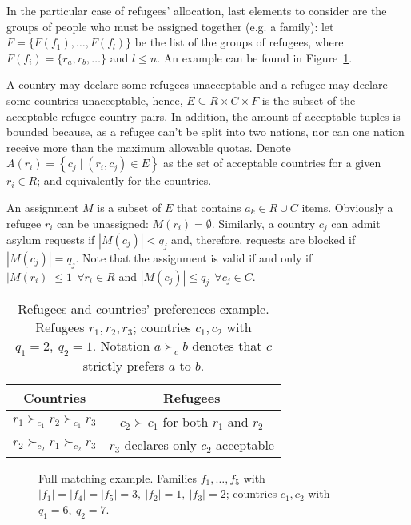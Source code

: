 In the particular case of refugees' allocation, last elements to consider are the groups of people who must be assigned together (e.g. a family): let \(F=\{F(f_1), \dots, F(f_l)\}\) be the list of the groups of refugees, where \(F(f_i) = \{r_a, r_b, \dots\}\) and \(l \leq n\).
An example can be found in Figure~\ref{fig:complete_matching}.

A country may declare some refugees unacceptable and a refugee may declare some countries unacceptable, hence, \(E \subseteq R \times C \times F\) is the subset of the acceptable refugee-country pairs. In addition, the amount of acceptable tuples is bounded because, as a refugee can't be split into two nations, nor can one nation receive more than the maximum allowable quotas. Denote \(A \left( r_i \right) = \left\{ c_j \mid \left( r_i, c_j \right) \in E \right\}\) as the set of acceptable countries for a given \(r_i \in R\); and equivalently for the countries.

An assignment \(M\) is a subset of \(E\) that contains \(a_k \in R \cup C\) items. Obviously a refugee \(r_i\) can be unassigned: \(M \left( r_i \right) = \emptyset\). Similarly, a country \(c_j\) can admit asylum requests if \(\left| M \left( c_j \right) \right| < q_j\) and, therefore, requests are blocked if \(\left| M \left( c_j \right) \right| = q_j\). Note that the assignment is valid if and only if \(\left| M \left( r_i \right) \right| \leq 1\ \ \forall r_i \in R\) and \(\left| M \left( c_j \right) \right| \leq q_j\ \ \forall c_j \in C\).

\begin{table}[!htb]
    \centering
    \begin{tabular}{c|c}
        \hline Countries & Refugees \\
        \hline \(r_1 \succ_{c_1} r_2 \succ_{c_1} r_3\) & \(c_2 \succ c_1\) for both \(r_1\) and \(r_2\) \\
        \(r_2 \succ_{c_2} r_1 \succ_{c_2} r_3\) & \(r_3\) declares only \(c_2\) acceptable \\
        \hline
    \end{tabular}
    \caption{Refugees and countries' preferences example. Refugees \(r_1, r_2, r_3\); countries \(c_1, c_2\) with \(q_1 = 2,\ q_2 = 1\). Notation \(a \succ_c b\) denotes that \(c\) strictly prefers \(a\) to \(b\).}
    \label{tab:countries-refugees}
    \vspace{-2em}
\end{table}

\begin{figure}[!htb]
    \centering{%
        \resizebox{0.9\columnwidth}{!}{%
            \def\svgwidth{\columnwidth}%
        }
    }
    \vspace{-0.5em}
    \caption{Full matching example. Families \(f_1, \dots, f_5\) with \(|f_1|=|f_4|=|f_5|=3,\ |f_2|=1,\ |f_3|=2\); countries \(c_1, c_2\) with \(q_1 = 6,\ q_2 = 7\).}
    \label{fig:complete_matching}
    \vspace{-1.5em}
\end{figure}
